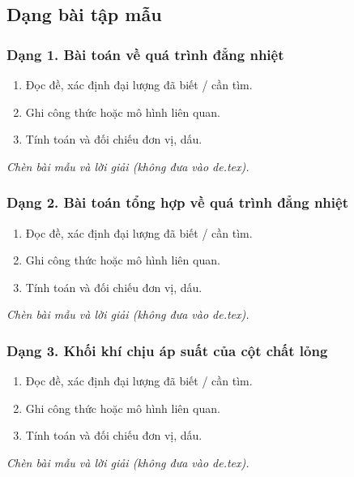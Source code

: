 

\subsection{Dạng bài tập mẫu}
\subsubsection{Dạng 1. Bài toán về quá trình đẳng nhiệt}
\begin{phuongphap}
\begin{enumerate}
\item Đọc đề, xác định đại lượng đã biết / cần tìm.
\item Ghi công thức hoặc mô hình liên quan.
\item Tính toán và đối chiếu đơn vị, dấu.
\end{enumerate}
\end{phuongphap}
\begin{vidumau}
\textit{Chèn bài mẫu và lời giải (không đưa vào de.tex).}
\end{vidumau}

\subsubsection{Dạng 2. Bài toán tổng hợp về quá trình đẳng nhiệt}
\begin{phuongphap}
\begin{enumerate}
\item Đọc đề, xác định đại lượng đã biết / cần tìm.
\item Ghi công thức hoặc mô hình liên quan.
\item Tính toán và đối chiếu đơn vị, dấu.
\end{enumerate}
\end{phuongphap}
\begin{vidumau}
\textit{Chèn bài mẫu và lời giải (không đưa vào de.tex).}
\end{vidumau}

\subsubsection{Dạng 3. Khối khí chịu áp suất của cột chất lỏng}
\begin{phuongphap}
\begin{enumerate}
\item Đọc đề, xác định đại lượng đã biết / cần tìm.
\item Ghi công thức hoặc mô hình liên quan.
\item Tính toán và đối chiếu đơn vị, dấu.
\end{enumerate}
\end{phuongphap}
\begin{vidumau}
\textit{Chèn bài mẫu và lời giải (không đưa vào de.tex).}
\end{vidumau}

